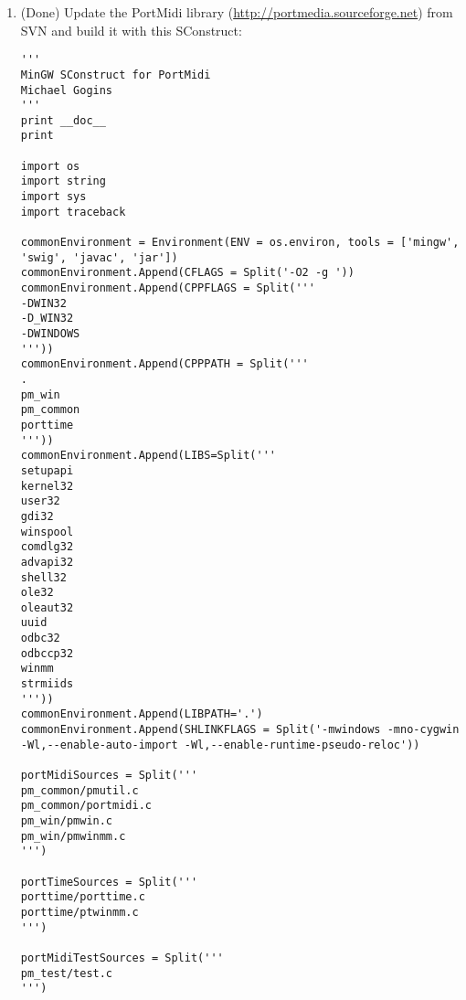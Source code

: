 \documentclass[11pt,letterpaper,onecolumn]{scrartcl}
\begin{document}
\begin{sloppypar}
\begin{enumerate}
\begin{enumerate}
\begin{lstlisting}
portAudioSources = Split('''
src/common/pa_allocation.c
src/common/pa_converters.c
src/common/pa_cpuload.c
src/common/pa_debugprint.c
src/common/pa_dither.c
src/common/pa_front.c
src/common/pa_process.c
src/common/pa_ringbuffer.c
src/common/pa_skeleton.c
src/common/pa_stream.c
src/common/pa_trace.c
src/hostapi/dsound/pa_win_ds.c
src/hostapi/dsound/pa_win_ds_dynlink.c
src/hostapi/wmme/pa_win_wmme.c
src/os/win/pa_win_hostapis.c
src/os/win/pa_win_util.c
src/os/win/pa_win_waveformat.c
src/hostapi/asio/ASIOSDK/common/asio.cpp
src/hostapi/asio/ASIOSDK/common/combase.cpp
src/hostapi/asio/ASIOSDK/common/debugmessage.cpp
src/hostapi/asio/ASIOSDK/common/register.cpp
src/hostapi/asio/ASIOSDK/host/ASIOConvertSamples.cpp
src/hostapi/asio/ASIOSDK/host/asiodrivers.cpp
src/hostapi/asio/ASIOSDK/host/pc/asiolist.cpp
src/hostapi/asio/iasiothiscallresolver.cpp
src/hostapi/asio/pa_asio.cpp
src/hostapi/wasapi/pa_win_wasapi.cpp
''')

portAudio = commonEnvironment.SharedLibrary('portaudio', portAudioSources)
\end{lstlisting}

			\item (Done) Update the PortMidi library (\url{http://portmedia.sourceforge.net}) from SVN and build it with this SConstruct:
			
\begin{lstlisting}
'''
MinGW SConstruct for PortMidi
Michael Gogins
'''
print __doc__
print

import os
import string
import sys
import traceback

commonEnvironment = Environment(ENV = os.environ, tools = ['mingw', 'swig', 'javac', 'jar'])
commonEnvironment.Append(CFLAGS = Split('-O2 -g '))
commonEnvironment.Append(CPPFLAGS = Split('''
-DWIN32 
-D_WIN32 
-DWINDOWS 
'''))
commonEnvironment.Append(CPPPATH = Split('''
. 
pm_win
pm_common
porttime
'''))
commonEnvironment.Append(LIBS=Split('''
setupapi
kernel32
user32
gdi32
winspool
comdlg32
advapi32
shell32
ole32
oleaut32
uuid
odbc32
odbccp32
winmm
strmiids 
'''))
commonEnvironment.Append(LIBPATH='.')
commonEnvironment.Append(SHLINKFLAGS = Split('-mwindows -mno-cygwin -Wl,--enable-auto-import -Wl,--enable-runtime-pseudo-reloc'))

portMidiSources = Split('''
pm_common/pmutil.c
pm_common/portmidi.c
pm_win/pmwin.c
pm_win/pmwinmm.c
''')

portTimeSources = Split('''
porttime/porttime.c
porttime/ptwinmm.c
''')

portMidiTestSources = Split('''
pm_test/test.c
''')


\end{lstlisting}
\end{enumerate}
\end{enumerate}
\end{sloppypar}
\end{document}
